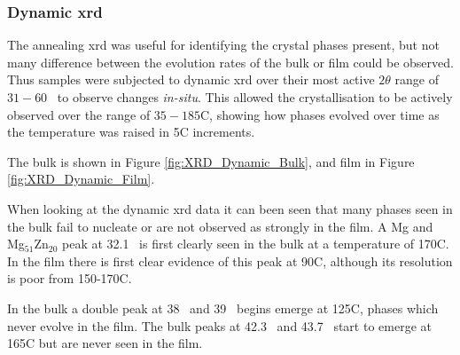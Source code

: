 \documentclass[a4paper,12pt,oneside]{article}%
\begin{document}
\subsubsection{Dynamic \acrshort{xrd}}

The annealing \acrshort{xrd} was useful for identifying the crystal phases present, but not many difference between the evolution rates of the bulk or film could be observed. Thus samples were subjected to dynamic \acrshort{xrd} over their most active $2 \theta$ range of $31-60$\degree~ to observe changes \textit{in-situ}. This allowed the crystallisation to be actively observed over the range of $35-185$\degree C, showing how phases evolved over time as the temperature was raised in 5\degree C increments. 

The bulk is shown in Figure \ref{fig:XRD_Dynamic_Bulk}, and film in Figure \ref{fig:XRD_Dynamic_Film}.

When looking at the dynamic \gls{xrd} data it can been seen that many phases seen in the bulk fail to nucleate or are not observed as strongly in the film. A Mg and Mg$_{51}$Zn$_{20}$ peak at 32.1\degree~ is first clearly seen in the bulk at a temperature of 170\degree C. In the film there is first clear evidence of this peak at 90\degree C, although its resolution is poor from 150-170\degree C. 

In the bulk a double peak at 38\degree~ and 39\degree~ begins emerge at 125\degree C, phases which never evolve in the film. The bulk peaks at 42.3\degree~ and 43.7\degree~ start to emerge at 165\degree C but are never seen in the film. 
\end{document}
